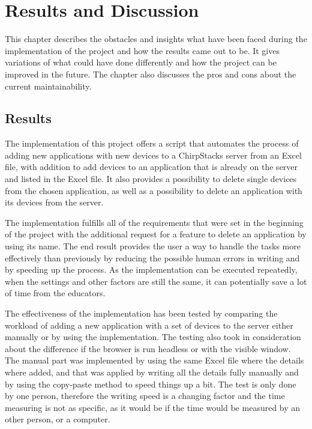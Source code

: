 
\chapter{Results and Discussion} \label{ch:res_and_disc}

This chapter describes the obstacles and insights what have been faced during the implementation of the project and how the results came out to be.
It gives variations of what could have done differently and how the project can be improved in the future.
The chapter also discusses the pros and cons about the current maintainability.

\section{Results}
The implementation of this project offers a script that automates the process of adding new applications with new devices to a ChirpStacks server from an Excel file, with addition to add devices to an application that is already on the server and listed in the Excel file.
It also provides a possibility to delete single devices from the chosen application, as well as a possibility to delete an application with its devices from the server.

The implementation fulfills all of the requirements that were set in the beginning of the project with the additional request for a feature to delete an application by using its name.
The end result provides the user a way to handle the tasks more effectively than previously by reducing the possible human errors in writing and by speeding up the process.
As the implementation can be executed repeatedly, when the settings and other factors are still the same, it can potentially save a lot of time from the educators.

The effectiveness of the implementation has been tested by comparing the workload of adding a new application with a set of devices to the server either manually or by using the implementation.
The testing also took in consideration about the difference if the browser is run headless or with the visible window.
The manual part was implemented by using the same Excel file where the details where added, and that was applied by writing all the details fully manually and by using the copy-paste method to speed things up a bit.
The test is only done by one person, therefore the writing speed is a changing factor and the time measuring is not as specific, as it would be if the time would be measured by an other person, or a computer.

